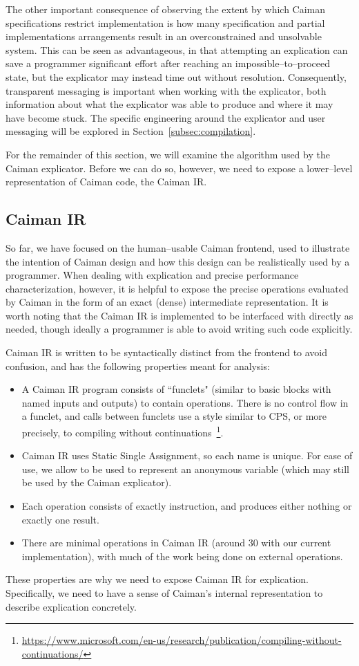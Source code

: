 The other important consequence of observing the extent by which Caiman specifications restrict implementation is how many specification and partial implementations arrangements result in an overconstrained and unsolvable system.  This can be seen as advantageous, in that attempting an explication can save a programmer significant effort after reaching an impossible--to--proceed state, but the explicator may instead time out without resolution.  Consequently, transparent messaging is important when working with the explicator, both information about what the explicator was able to produce and where it may have become stuck.  The specific engineering around the explicator and user messaging will be explored in Section~\ref{subsec:compilation}.

For the remainder of this section, we will examine the algorithm used by the Caiman explicator.  Before we can do so, however, we need to expose a lower--level representation of Caiman code, the Caiman IR.

\subsection{Caiman IR}
\label{subsec:ir}

So far, we have focused on the human--usable Caiman frontend, used to illustrate the intention of Caiman design and how this design can be realistically used by a programmer.  When dealing with explication and precise performance characterization, however, it is helpful to expose the precise operations evaluated by Caiman in the form of an exact (dense) intermediate representation.  It is worth noting that the Caiman IR is implemented to be interfaced with directly as needed, though ideally a programmer is able to avoid writing such code explicitly.

Caiman IR is written to be syntactically distinct from the frontend to avoid confusion, and has the following properties meant for analysis:
%
\begin{itemize}
\item A Caiman IR program consists of ``funclets" (similar to basic blocks with named inputs and outputs) to contain operations.  There is no control flow in a funclet, and calls between funclets use a style similar to CPS, or more precisely, to compiling without continuations~\footnote{\url{https://www.microsoft.com/en-us/research/publication/compiling-without-continuations/}}.
\item Caiman IR uses Static Single Assignment, so each name is unique.  For ease of use, we allow \code{\%_} to be used to represent an anonymous variable (which may still be used by the Caiman explicator).
\item Each operation consists of exactly instruction, and produces either nothing or exactly one result.
\item There are minimal operations in Caiman IR (around 30 with our current implementation), with much of the work being done on external operations.
\end{itemize}
%
These properties are why we need to expose Caiman IR for explication.  Specifically, we need to have a sense of Caiman's internal representation to describe explication concretely.  

